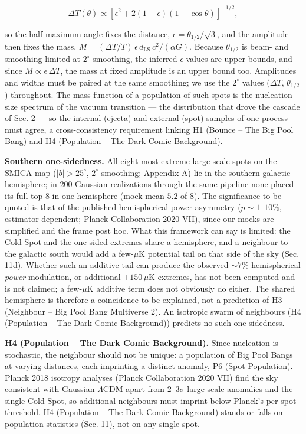 \documentclass[
  11pt,
]{article}
\begin{document}
\[\Delta T(\theta) \propto \left[\epsilon^2 + 2(1+\epsilon)(1-\cos\theta)\right]^{-1/2},\]

so the half-maximum angle fixes the distance,
\(\epsilon = \theta_{1/2}/\sqrt{3}\), and the amplitude then fixes the
mass, \(M = (\Delta T/T)\,\epsilon\,d_{\text{LS}}\,c^2/(\alpha G)\).
Because \(\theta_{1/2}\) is beam- and smoothing-limited at \(2^\circ\)
smoothing, the inferred \(\epsilon\) values are upper bounds, and since
\(M \propto \epsilon\,\Delta T\), the mass at fixed amplitude is an
upper bound too. Amplitudes and widths must be paired at the same
smoothing; we use the \(2^\circ\) values (\(\Delta T\),
\(\theta_{1/2}\)) throughout. The mass function of a population of such
spots is the nucleation size spectrum of the vacuum transition --- the
distribution that drove the cascade of Sec. 2 --- so the internal
(ejecta) and external (spot) samples of one process must agree, a
cross-consistency requirement linking H1 (Bounce -- The Big Pool Bang)
and H4 (Population -- The Dark Comic Background).

\textbf{Southern one-sidedness.} All eight most-extreme large-scale
spots on the SMICA map (\(|b| > 25^\circ\), \(2^\circ\) smoothing;
Appendix A) lie in the southern galactic hemisphere; in 200 Gaussian
realizations through the same pipeline none placed its full top-8 in one
hemisphere (mock mean \(5.2\) of \(8\)). The significance to be quoted
is that of the published hemispherical power asymmetry
(\(p \sim 1\)--\(10\%\), estimator-dependent; Planck Collaboration 2020
VII), since our mocks are simplified and the frame post hoc. What this
framework can say is limited: the Cold Spot and the one-sided extremes
share a hemisphere, and a neighbour to the galactic south would add a
few-\(\mu\)K potential tail on that side of the sky (Sec. 11d). Whether
such an additive tail can produce the observed \(\sim\!7\%\)
hemispherical \emph{power} modulation, or additional \(\pm 150\,\mu\)K
extremes, has not been computed and is not claimed; a few-\(\mu\)K
additive term does not obviously do either. The shared hemisphere is
therefore a coincidence to be explained, not a prediction of H3
(Neighbour -- Big Pool Bang Multiverse 2). An isotropic swarm of
neighbours (H4 (Population -- The Dark Comic Background)) predicts no
such one-sidedness.

\textbf{H4 (Population -- The Dark Comic Background).} Since nucleation
is stochastic, the neighbour should not be unique: a population of Big
Pool Bangs at varying distances, each imprinting a distinct anomaly, P6
(Spot Population). Planck 2018 isotropy analyses (Planck Collaboration
2020 VII) find the sky consistent with Gaussian \(\Lambda\)CDM apart
from \(2\)--\(3\sigma\) large-scale anomalies and the single Cold Spot,
so additional neighbours must imprint below Planck's per-spot threshold.
H4 (Population -- The Dark Comic Background) stands or falls on
population statistics (Sec. 11), not on any single spot.
\end{document}
